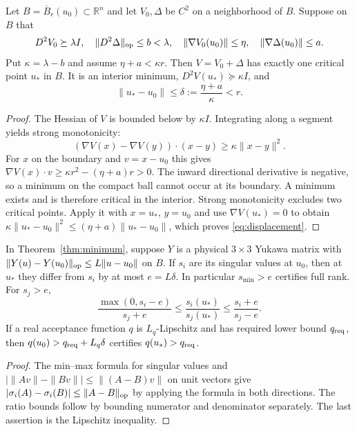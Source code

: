 \begin{theorem}\label{thm:minimum}
Let $B=\overline B_r(u_0)\subset\mathbb R^n$ and let $V_0,\Delta$
be $C^2$ on a neighborhood of $B$. Suppose on $B$ that
\[
 D^2V_0\succeq\lambda I,\quad
 \|D^2\Delta\|_{\rm op}\le b<\lambda,\quad
 \|\nabla V_0(u_0)\|\le\eta,\quad
 \|\nabla\Delta(u_0)\|\le a.
\]
Put $\kappa=\lambda-b$ and assume $\eta+a<\kappa r$.
Then $V=V_0+\Delta$ has exactly one critical point $u_*$ in $B$.
It is an interior minimum, $D^2V(u_*)\succeq\kappa I$, and
\begin{equation}\label{eq:displacement}
 \|u_*-u_0\|\le\delta:=\frac{\eta+a}{\kappa}<r.
\end{equation}
\end{theorem}
\begin{proof}
The Hessian of $V$ is bounded below by $\kappa I$. Integrating along
a segment yields strong monotonicity:
\[
 (\nabla V(x)-\nabla V(y))\cdot(x-y)\ge\kappa\|x-y\|^2.
\]
For $x$ on the boundary and $v=x-u_0$ this gives
$\nabla V(x)\cdot v\ge\kappa r^2-(\eta+a)r>0$.
The inward directional derivative is negative, so a minimum on the
compact ball cannot occur at its boundary. A minimum exists and is
therefore critical in the interior. Strong monotonicity excludes two
critical points. Apply it with $x=u_*$, $y=u_0$ and use
$\nabla V(u_*)=0$ to obtain
$\kappa\|u_*-u_0\|^2\le(\eta+a)\|u_*-u_0\|$,
which proves \eqref{eq:displacement}.
\end{proof}

\begin{proposition}\label{prop:persistence}
In Theorem~\ref{thm:minimum}, suppose $Y$ is a physical $3\times3$ Yukawa
matrix with $\|Y(u)-Y(u_0)\|_{\rm op}\le L\|u-u_0\|$ on $B$.
If $s_i$ are its singular values at $u_0$, then at $u_*$ they differ
from $s_i$ by at most $e=L\delta$. In particular $s_{\min}>e$
certifies full rank. For $s_j>e$,
\[
 \frac{\max(0,s_i-e)}{s_j+e}
 \le\frac{s_i(u_*)}{s_j(u_*)}
 \le\frac{s_i+e}{s_j-e}.
\]
If a real acceptance function $q$ is $L_q$-Lipschitz and has required
lower bound $q_{\rm req}$, then
$q(u_0)>q_{\rm req}+L_q\delta$ certifies $q(u_*)>q_{\rm req}$.
\end{proposition}
\begin{proof}
The min--max formula for singular values and
$|\|Av\|-\|Bv\||\le\|(A-B)v\|$ on unit vectors give
$|\sigma_i(A)-\sigma_i(B)|\le\|A-B\|_{\rm op}$ by applying the
formula in both directions. The ratio bounds follow by bounding numerator
and denominator separately. The last assertion is the Lipschitz inequality.
\end{proof}

